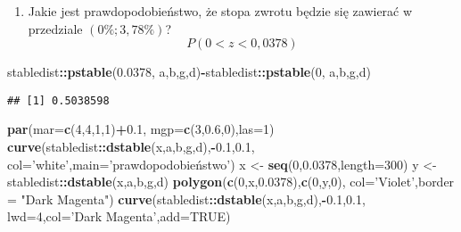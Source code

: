 \documentclass[polish,]{book}
\newenvironment{Shaded}{\begin{snugshade}}{\end{snugshade}}
\newcommand{\DataTypeTok}[1]{\textcolor[rgb]{0.13,0.29,0.53}{#1}}
\newcommand{\DecValTok}[1]{\textcolor[rgb]{0.00,0.00,0.81}{#1}}
\newcommand{\FloatTok}[1]{\textcolor[rgb]{0.00,0.00,0.81}{#1}}
\newcommand{\KeywordTok}[1]{\textcolor[rgb]{0.13,0.29,0.53}{\textbf{#1}}}
\newcommand{\NormalTok}[1]{#1}
\newcommand{\OperatorTok}[1]{\textcolor[rgb]{0.81,0.36,0.00}{\textbf{#1}}}
\newcommand{\OtherTok}[1]{\textcolor[rgb]{0.56,0.35,0.01}{#1}}
\newcommand{\StringTok}[1]{\textcolor[rgb]{0.31,0.60,0.02}{#1}}
\providecommand{\tightlist}{%
  \setlength{\itemsep}{0pt}\setlength{\parskip}{0pt}}
\begin{document}
\begin{enumerate}
\def\labelenumi{\arabic{enumi}.}
\setcounter{enumi}{2}
\tightlist
\item
  Jakie jest prawdopodobieństwo, że stopa zwrotu będzie się zawierać w przedziale
  \((0\%; 3,78\%)\)?
  \[P(0<z<0,0378)\]
\end{enumerate}

\begin{Shaded}
\begin{Highlighting}[]
\NormalTok{stabledist}\OperatorTok{::}\KeywordTok{pstable}\NormalTok{(}\FloatTok{0.0378}\NormalTok{, a,b,g,d)}\OperatorTok{-}\NormalTok{stabledist}\OperatorTok{::}\KeywordTok{pstable}\NormalTok{(}\DecValTok{0}\NormalTok{, a,b,g,d)}
\end{Highlighting}
\end{Shaded}

\begin{verbatim}
## [1] 0.5038598
\end{verbatim}

\begin{Shaded}
\begin{Highlighting}[]
\KeywordTok{par}\NormalTok{(}\DataTypeTok{mar=}\KeywordTok{c}\NormalTok{(}\DecValTok{4}\NormalTok{,}\DecValTok{4}\NormalTok{,}\DecValTok{1}\NormalTok{,}\DecValTok{1}\NormalTok{)}\OperatorTok{+}\FloatTok{0.1}\NormalTok{, }\DataTypeTok{mgp=}\KeywordTok{c}\NormalTok{(}\DecValTok{3}\NormalTok{,}\FloatTok{0.6}\NormalTok{,}\DecValTok{0}\NormalTok{),}\DataTypeTok{las=}\DecValTok{1}\NormalTok{)}
\KeywordTok{curve}\NormalTok{(stabledist}\OperatorTok{::}\KeywordTok{dstable}\NormalTok{(x,a,b,g,d),}\OperatorTok{-}\FloatTok{0.1}\NormalTok{,}\FloatTok{0.1}\NormalTok{,}
      \DataTypeTok{col=}\StringTok{'white'}\NormalTok{,}\DataTypeTok{main=}\StringTok{'prawdopodobieństwo'}\NormalTok{)}
\NormalTok{x <-}\StringTok{ }\KeywordTok{seq}\NormalTok{(}\DecValTok{0}\NormalTok{,}\FloatTok{0.0378}\NormalTok{,}\DataTypeTok{length=}\DecValTok{300}\NormalTok{)}
\NormalTok{y <-}\StringTok{ }\NormalTok{stabledist}\OperatorTok{::}\KeywordTok{dstable}\NormalTok{(x,a,b,g,d)}
\KeywordTok{polygon}\NormalTok{(}\KeywordTok{c}\NormalTok{(}\DecValTok{0}\NormalTok{,x,}\FloatTok{0.0378}\NormalTok{),}\KeywordTok{c}\NormalTok{(}\DecValTok{0}\NormalTok{,y,}\DecValTok{0}\NormalTok{),}
        \DataTypeTok{col=}\StringTok{'Violet'}\NormalTok{,}\DataTypeTok{border =} \StringTok{"Dark Magenta"}\NormalTok{)}
\KeywordTok{curve}\NormalTok{(stabledist}\OperatorTok{::}\KeywordTok{dstable}\NormalTok{(x,a,b,g,d),}\OperatorTok{-}\FloatTok{0.1}\NormalTok{,}\FloatTok{0.1}\NormalTok{,}
      \DataTypeTok{lwd=}\DecValTok{4}\NormalTok{,}\DataTypeTok{col=}\StringTok{'Dark Magenta'}\NormalTok{,}\DataTypeTok{add=}\OtherTok{TRUE}\NormalTok{)}
\end{Highlighting}
\end{Shaded}
\end{document}

